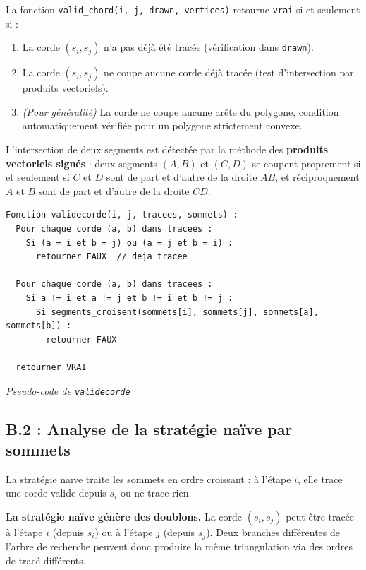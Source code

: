 \documentclass[12pt,a4paper]{article}
\begin{document}
La fonction \texttt{valid\_chord(i, j, drawn, vertices)} retourne \texttt{vrai} si
et seulement si :

\begin{enumerate}
  \item La corde $(s_i, s_j)$ n'a pas déjà été tracée (vérification dans \texttt{drawn}).
  \item La corde $(s_i, s_j)$ ne coupe aucune corde déjà tracée (test d'intersection
        par produits vectoriels).
  \item \textit{(Pour généralité)} La corde ne coupe aucune arête du polygone, condition
        automatiquement vérifiée pour un polygone strictement convexe.
\end{enumerate}

L'intersection de deux segments est détectée par la méthode des \textbf{produits
vectoriels signés} : deux segments $(A,B)$ et $(C,D)$ se coupent proprement si et
seulement si $C$ et $D$ sont de part et d'autre de la droite $AB$, et réciproquement
$A$ et $B$ sont de part et d'autre de la droite $CD$.

\begin{lstlisting}[nolol]
Fonction validecorde(i, j, tracees, sommets) :
  Pour chaque corde (a, b) dans tracees :
    Si (a = i et b = j) ou (a = j et b = i) :
      retourner FAUX  // deja tracee

  Pour chaque corde (a, b) dans tracees :
    Si a != i et a != j et b != i et b != j :
      Si segments_croisent(sommets[i], sommets[j], sommets[a], sommets[b]) :
        retourner FAUX

  retourner VRAI
\end{lstlisting}
\begin{center}
{\small\itshape Pseudo-code de \texttt{validecorde}}
\end{center}

\subsection{B.2 : Analyse de la stratégie naïve par sommets}

La stratégie naïve traite les sommets en ordre croissant : à l'étape $i$, elle trace une
corde valide depuis $s_i$ ou ne trace rien.

\textbf{La stratégie naïve génère des doublons.} La corde $(s_i, s_j)$ peut être tracée
à l'étape $i$ (depuis $s_i$) ou à l'étape $j$ (depuis $s_j$). Deux branches différentes
de l'arbre de recherche peuvent donc produire la même triangulation via des ordres de
tracé différents.
\end{document}
